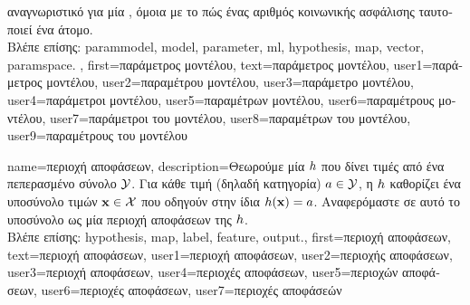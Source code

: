 {{{		αναγνωριστικό για μία}  , \foreignlanguage{greek}{όμοια με το πώς ένας αριθμός 
		κοινωνικής ασφάλισης ταυτοποιεί ένα άτομο.}
		\\
		\foreignlanguage{greek}{Βλέπε επίσης:} \gls{parammodel}, \gls{model}, \gls{parameter}, \gls{ml}, \gls{hypothesis}, \gls{map}, 
		\gls{vector}, \gls{paramspace}.  },
	first={\foreignlanguage{greek}{παράμετρος μοντέλου}},
	text={\foreignlanguage{greek}{παράμετρος μοντέλου}},
	user1={\foreignlanguage{greek}{παράμετρος μοντέλου}}, %
	user2={\foreignlanguage{greek}{παραμέτρου μοντέλου}}, %
	user3={\foreignlanguage{greek}{παράμετρο μοντέλου}}, %
	user4={\foreignlanguage{greek}{παράμετροι μοντέλου}}, %
	user5={\foreignlanguage{greek}{παραμέτρων μοντέλου}}, %
	user6={\foreignlanguage{greek}{παραμέτρους μοντέλου}}, %
	user7={\foreignlanguage{greek}{παράμετροι του μοντέλου}}, %
	user8={\foreignlanguage{greek}{παραμέτρων του μοντέλου}}, %
	user9={\foreignlanguage{greek}{παραμέτρους του μοντέλου}} %
}

{name={\foreignlanguage{greek}{περιοχή αποφάσεων}}, 
	description={\foreignlanguage{greek}{Θεωρούμε μία}  
		 $h$ \foreignlanguage{greek}{που δίνει τιμές από ένα πεπερασμένο σύνολο $\mathcal{Y}$. 
		Για κάθε τιμή}  \foreignlanguage{greek}{(δηλαδή κατηγορία) $a \in \mathcal{Y}$, η}  
		$h$ \foreignlanguage{greek}{καθορίζει ένα υποσύνολο τιμών}  ${\bf x} \in \mathcal{X}$ 
		\foreignlanguage{greek}{που οδηγούν στην ίδια}  $h({\bf x})=a$. 
		\foreignlanguage{greek}{Αναφερόμαστε σε αυτό το υποσύνολο ως μία περιοχή αποφάσεων της} 
		 $h$.
		\\
		\foreignlanguage{greek}{Βλέπε επίσης:} \gls{hypothesis}, \gls{map}, \gls{label}, \gls{feature}, \gls{output}.},
	first={\foreignlanguage{greek}{περιοχή αποφάσεων}},
	text={\foreignlanguage{greek}{περιοχή αποφάσεων}},
	user1={\foreignlanguage{greek}{περιοχή αποφάσεων}}, %
	user2={\foreignlanguage{greek}{περιοχής αποφάσεων}}, %
	user3={\foreignlanguage{greek}{περιοχή αποφάσεων}}, %
	user4={\foreignlanguage{greek}{περιοχές αποφάσεων}}, %
	user5={\foreignlanguage{greek}{περιοχών αποφάσεων}}, %
	user6={\foreignlanguage{greek}{περιοχές αποφάσεων}}, %
	user7={\foreignlanguage{greek}{περιοχές αποφάσεών}} %
}

